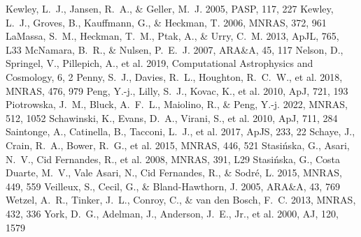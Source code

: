 \documentclass[twocolumn]{aastex631}
\begin{document}
\begin{thebibliography}{}
 Kewley, L.~J., Jansen, R.~A., \& Geller, M.~J. 2005, PASP, 117, 227
 Kewley, L.~J., Groves, B., Kauffmann, G., \& Heckman, T. 2006, MNRAS, 372, 961
 LaMassa, S.~M., Heckman, T.~M., Ptak, A., \& Urry, C.~M. 2013, ApJL, 765, L33
 McNamara, B.~R., \& Nulsen, P.~E.~J. 2007, ARA\&A, 45, 117
 Nelson, D., Springel, V., Pillepich, A., et al. 2019, Computational Astrophysics and Cosmology, 6, 2
 Penny, S.~J., Davies, R.~L., Houghton, R.~C.~W., et al. 2018, MNRAS, 476, 979
 Peng, Y.-j., Lilly, S.~J., Kovac, K., et al. 2010, ApJ, 721, 193
 Piotrowska, J.~M., Bluck, A.~F.~L., Maiolino, R., \& Peng, Y.-j. 2022, MNRAS, 512, 1052
 Schawinski, K., Evans, D.~A., Virani, S., et al. 2010, ApJ, 711, 284
 Saintonge, A., Catinella, B., Tacconi, L.~J., et al. 2017, ApJS, 233, 22
 Schaye, J., Crain, R.~A., Bower, R.~G., et al. 2015, MNRAS, 446, 521
 Stasi{\'n}ska, G., Asari, N.~V., Cid Fernandes, R., et al. 2008, MNRAS, 391, L29
 Stasi{\'n}ska, G., Costa Duarte, M.~V., Vale Asari, N., Cid Fernandes, R., \& Sodr{\'e}, L. 2015, MNRAS, 449, 559
 Veilleux, S., Cecil, G., \& Bland-Hawthorn, J. 2005, ARA\&A, 43, 769
 Wetzel, A.~R., Tinker, J.~L., Conroy, C., \& van den Bosch, F.~C. 2013, MNRAS, 432, 336
 York, D.~G., Adelman, J., Anderson, J.~E., Jr., et al. 2000, AJ, 120, 1579
\end{thebibliography}
\end{document}
